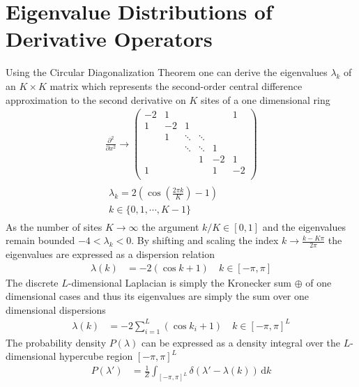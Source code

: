 \appendix

\chapter{Eigenvalue Distributions of Derivative Operators}
\label{appendix:eigenvalue-distributions}
Using the Circular Diagonalization Theorem \cite{Ingleton1956TheMatrices} one can derive the eigenvalues $\lambda_k$ of an $K\times K$ matrix which represents the second-order central difference approximation to the second derivative on $K$ sites of a one dimensional ring
\begin{align}
	\frac{\partial^2}{\partial x^2} \rightarrow
	\begin{pmatrix}
	  -2 & 1 &  &  &  & 1 \\
	  1 & -2 & 1 &  &  &  \\
	  & 1 & \ddots & \ddots &  & \\
	  & & \ddots & \ddots & 1 & \\
	  & & & 1 & -2 & 1 \\
	  1 & & & & 1 & -2 \\
	\end{pmatrix}\\
	\begin{matrix}
	  \lambda_k =2\left(\cos\left(\frac{2\pi k}{K}\right)-1\right) \\
	  k\in\{0,1,\cdots,K-1\}
	\end{matrix}
	\qquad
\end{align}
As the number of sites $K\rightarrow\infty$ the argument $k/K\in[0,1]$
and the eigenvalues remain bounded $-4<\lambda_k<0$. By shifting and scaling
the index $k\rightarrow\frac{k-K\pi}{2\pi}$ the eigenvalues are expressed as
a dispersion relation
\begin{align}
  \lambda(k)&=
  -2\left(\cos k+1\right)
  \quad k\in[-\pi,\pi]
\end{align}
The discrete $L$-dimensional Laplacian is simply the Kronecker sum $\oplus$ of one
dimensional cases and thus its eigenvalues are simply the sum over one dimensional dispersions \cite{Laub2004MatrixEngineers}
\begin{align}
  \lambda(k)&=
  -2\sum_{i=1}^L\left(\cos k_i+1\right)
  \quad k\in[-\pi,\pi]^L
\end{align}
The probability density $P(\lambda)$ can be expressed as a density integral
over the $L$-dimensional hypercube region $[-\pi,\pi]^L$
\begin{align}
	P(\lambda')&=\frac{1}{Z}\int_{[-\pi,\pi]^L}\!\delta(\lambda'-\lambda(k))\,\mathrm{d}k
\end{align}
